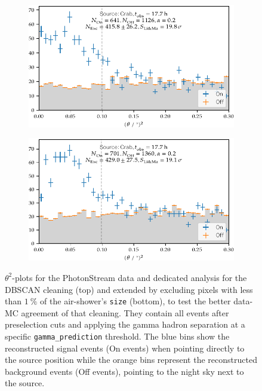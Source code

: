 \begin{figure}
  \begin{subfigure}{\textwidth}
    \centering
    \includegraphics[width=\textwidth]{Plots/results/DBSCAN/theta2_plot.pdf}
  \end{subfigure}
  \begin{subfigure}{\textwidth}
    \centering
    \includegraphics[width=\textwidth]{Plots/results/DBSCAN_perc/theta2_plot.pdf}
  \end{subfigure}
  \caption{$\theta^2$-plots for the PhotonStream data and dedicated analysis for the DBSCAN cleaning (top) and extended by excluding pixels with less than $\SI{1}{\percent}$ of the air-shower's \texttt{size} (bottom), to test the better data-MC agreement of that cleaning. They contain all events after preselection cuts and applying the gamma hadron separation at a specific \texttt{gamma\_prediction} threshold. The blue bins show the reconstructed signal events (On events) when pointing directly to the source position while the orange bins represent the reconstructed background events (Off events), pointing to the night sky next to the source.}
  \label{fig:theta2}
\end{figure}
%

